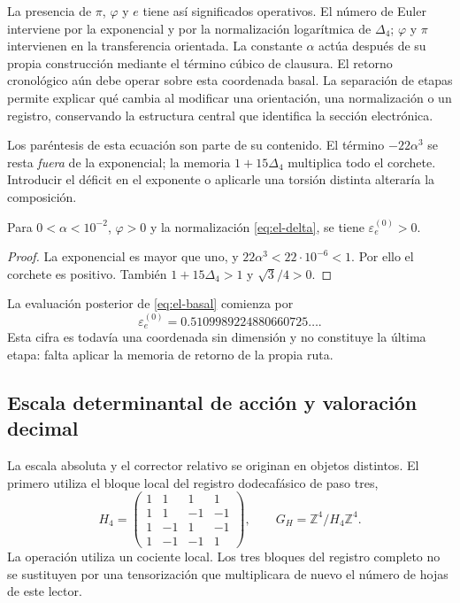La presencia de \(\pi\), \(\varphi\) y \(e\) tiene así significados
operativos. El número de Euler interviene por la exponencial y por
la normalización logarítmica de \(\Delta_4\); \(\varphi\) y \(\pi\)
intervienen en la transferencia orientada. La constante \(\alpha\)
actúa después de su propia construcción mediante el término cúbico
de clausura. El retorno cronológico aún debe operar sobre esta coordenada
basal. La separación de etapas permite explicar qué cambia al modificar
una orientación, una normalización o un registro, conservando la estructura
central que identifica la sección electrónica.

Los paréntesis de esta ecuación son parte de su contenido. El término
\(-22\alpha^3\) se resta \emph{fuera} de la exponencial; la memoria
\(1+15\Delta_4\) multiplica todo el corchete. Introducir el déficit en
el exponente o aplicarle una torsión distinta alteraría la composición.

\begin{proposition}
Para \(0<\alpha<10^{-2}\), \(\varphi>0\) y la normalización
\eqref{eq:el-delta}, se tiene \(\varepsilon_e^{(0)}>0\).
\end{proposition}
\begin{proof}
La exponencial es mayor que uno, y
\(22\alpha^3<22\cdot10^{-6}<1\). Por ello el corchete es positivo.
También \(1+15\Delta_4>1\) y \(\sqrt3/4>0\).
\end{proof}

La evaluación posterior de \eqref{eq:el-basal} comienza por
\[
 \varepsilon_e^{(0)}=0.5109989224880660725\ldots.
\]
Esta cifra es todavía una coordenada sin dimensión y no constituye la
última etapa: falta aplicar la memoria de retorno de la propia ruta.

\subsection{Escala determinantal de acción y valoración decimal}

La escala absoluta y el corrector relativo se originan en objetos
distintos. El primero utiliza el bloque local del registro dodecafásico
de paso tres,
\begin{equation}
 H_4=\begin{pmatrix}
 1&1&1&1\\1&1&-1&-1\\1&-1&1&-1\\1&-1&-1&1
 \end{pmatrix},\qquad
 G_H=\mathbb Z^4/H_4\mathbb Z^4.
 \label{eq:el-h4}
\end{equation}
La operación utiliza un cociente local. Los tres bloques del registro
completo no se sustituyen por una tensorización que multiplicara de
nuevo el número de hojas de este lector.

